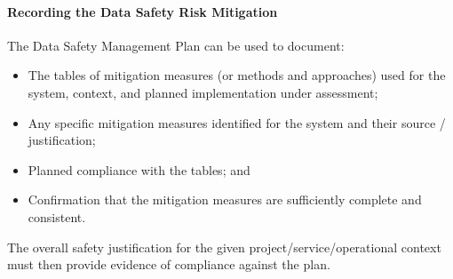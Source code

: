\paragraph{Recording the Data Safety Risk Mitigation}
The Data Safety Management Plan can be used to document:
\begin{itemize}
  \item The tables of mitigation measures (or methods and approaches) used for the system, context, and planned implementation under assessment;
  \item Any specific mitigation measures identified for the system and their source / justification;
  \item Planned compliance with the tables; and
  \item Confirmation that the mitigation measures are sufficiently complete and consistent.
\end{itemize}  
The overall safety justification for the given project/service/operational context must then provide evidence of compliance against the plan.
